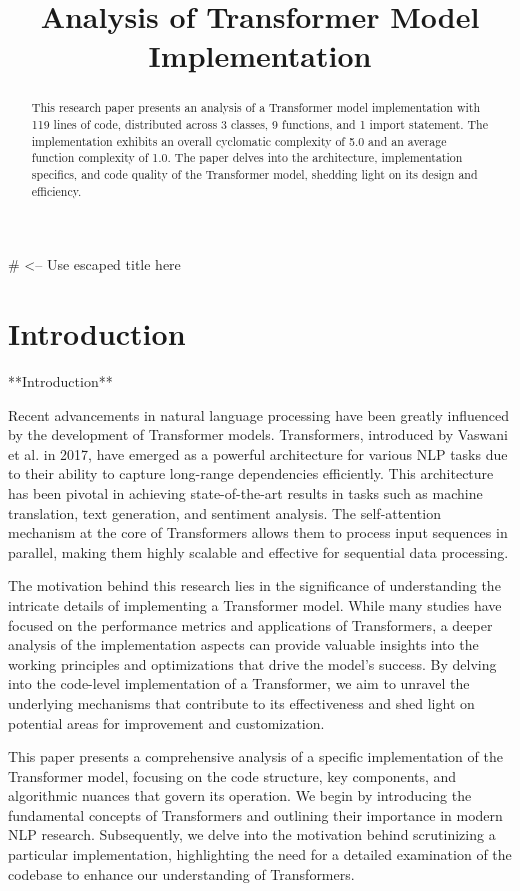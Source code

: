 \documentclass[10pt,journal,compsoc]{IEEEtran}
\begin{document}
\title{Analysis of Transformer Model Implementation} # <-- Use escaped title here

\begin{abstract}
This research paper presents an analysis of a Transformer model implementation with 119 lines of code, distributed across 3 classes, 9 functions, and 1 import statement. The implementation exhibits an overall cyclomatic complexity of 5.0 and an average function complexity of 1.0. The paper delves into the architecture, implementation specifics, and code quality of the Transformer model, shedding light on its design and efficiency.
\end{abstract}

\section{Introduction}
**Introduction**

Recent advancements in natural language processing have been greatly influenced by the development of Transformer models. Transformers, introduced by Vaswani et al. in 2017, have emerged as a powerful architecture for various NLP tasks due to their ability to capture long-range dependencies efficiently. This architecture has been pivotal in achieving state-of-the-art results in tasks such as machine translation, text generation, and sentiment analysis. The self-attention mechanism at the core of Transformers allows them to process input sequences in parallel, making them highly scalable and effective for sequential data processing.

The motivation behind this research lies in the significance of understanding the intricate details of implementing a Transformer model. While many studies have focused on the performance metrics and applications of Transformers, a deeper analysis of the implementation aspects can provide valuable insights into the working principles and optimizations that drive the model's success. By delving into the code-level implementation of a Transformer, we aim to unravel the underlying mechanisms that contribute to its effectiveness and shed light on potential areas for improvement and customization.

This paper presents a comprehensive analysis of a specific implementation of the Transformer model, focusing on the code structure, key components, and algorithmic nuances that govern its operation. We begin by introducing the fundamental concepts of Transformers and outlining their importance in modern NLP research. Subsequently, we delve into the motivation behind scrutinizing a particular implementation, highlighting the need for a detailed examination of the codebase to enhance our understanding of Transformers.
\end{document}
